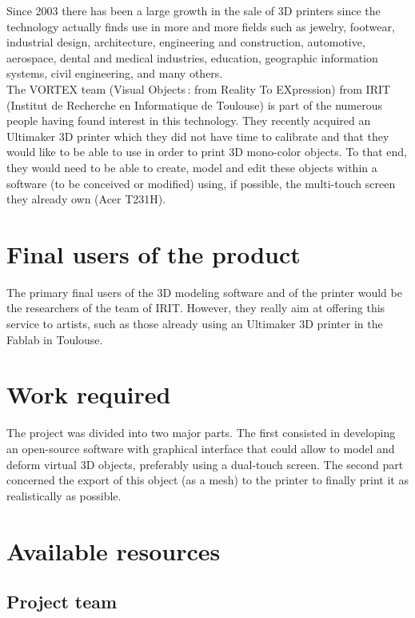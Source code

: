 \documentclass{report}
\begin{document}
	Since 2003 there has been a large growth in the sale of 3D printers since the technology actually finds use in more and more fields such as jewelry, footwear, industrial design, architecture, engineering and construction, automotive, aerospace, dental and medical industries, education, geographic information systems, civil engineering, and many others.\\

	The VORTEX team (Visual Objects : from Reality To EXpression) from IRIT (Institut de Recherche en Informatique de Toulouse) is part of the numerous people having found interest in this technology. They recently acquired an Ultimaker 3D printer which they did not have time to calibrate and that they would like to be able to use in order to print 3D mono-color objects. To that end, they would need to be able to create, model and edit these objects within a software (to be conceived or modified) using, if possible, the multi-touch screen they already own (Acer T231H).\\

\section{Final users of the product}

	The primary final users of the 3D modeling software and of the printer would be the researchers of the team of IRIT. However, they really aim at offering this service to artists, such as those already using an Ultimaker 3D printer in the Fablab in Toulouse.

\section{Work required}

	The project was divided into two major parts. The first consisted in developing an open-source software with graphical interface that could allow to model and deform virtual 3D objects, preferably using a dual-touch screen. The second part concerned the export of this object (as a mesh) to the printer to finally print it as realistically as possible.

\section{Available resources}

\subsection{Project team}
\end{document}
